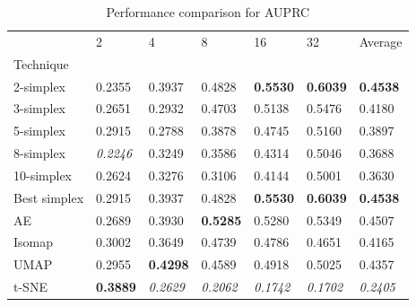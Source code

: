 \begin{table}
\caption{Performance comparison for AUPRC}
\label{tab:results_auprc}
\begin{center}
\begin{tabular}{lllllll}
\toprule
 & 2 & 4 & 8 & 16 & 32 & Average \\
Technique &  &  &  &  &  &  \\
\midrule
2-simplex & 0.2355 & 0.3937 & 0.4828 & \textbf{0.5530} & \textbf{0.6039} & \textbf{0.4538} \\
3-simplex & 0.2651 & 0.2932 & 0.4703 & 0.5138 & 0.5476 & 0.4180 \\
5-simplex & 0.2915 & 0.2788 & 0.3878 & 0.4745 & 0.5160 & 0.3897 \\
8-simplex & \textit{0.2246} & 0.3249 & 0.3586 & 0.4314 & 0.5046 & 0.3688 \\
10-simplex & 0.2624 & 0.3276 & 0.3106 & 0.4144 & 0.5001 & 0.3630 \\
Best simplex & 0.2915 & 0.3937 & 0.4828 & \textbf{0.5530} & \textbf{0.6039} & \textbf{0.4538} \\
AE & 0.2689 & 0.3930 & \textbf{0.5285} & 0.5280 & 0.5349 & 0.4507 \\
Isomap & 0.3002 & 0.3649 & 0.4739 & 0.4786 & 0.4651 & 0.4165 \\
UMAP & 0.2955 & \textbf{0.4298} & 0.4589 & 0.4918 & 0.5025 & 0.4357 \\
t-SNE & \textbf{0.3889} & \textit{0.2629} & \textit{0.2062} & \textit{0.1742} & \textit{0.1702} & \textit{0.2405} \\
\bottomrule
\end{tabular}
\end{center}
\end{table}


